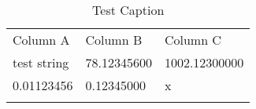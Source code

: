 \begin{table*}[h]
\caption{Test Caption}
\label{test:label}\begin{tabular}{lll}
\noalign{\smallskip}\hline\noalign{\smallskip}
Column A&Column B&Column C\\\noalign{\smallskip}\hline
test string&78.12345600&1002.12300000\\
0.01123456&0.12345000&x\\
\noalign{\smallskip}\hline
\end{tabular}
\end{table*}